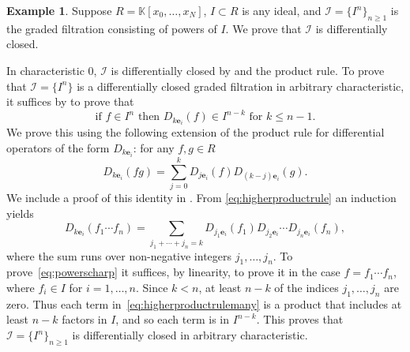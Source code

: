 \documentclass[12pt, reqno]{amsart}
\numberwithin{equation}{section}
\newcommand{\be}{\mathbf{e}}
\newcommand{\kk}{\mathbb{K}}
\newcommand{\I}{{\mathcal I}}
\theoremstyle{plain} %
\theoremstyle{definition}
\newtheorem{ex}[thm]{Example}
\theoremstyle{remark}
\begin{document}
\begin{ex}\label{ex:PowersDiffClosed}
Suppose $R=\kk[x_0,\ldots,x_N]$, $I\subset R$ is any ideal, and $\I=\{I^{n}\}_{n\ge 1}$ is the graded filtration consisting of powers of $I$.  We prove that $\I$ is differentially closed.

In characteristic $0$, $\I$ is differentially closed by  and the product rule.
To prove that $\I=\{I^n\}$ is a differentially closed graded filtration in arbitrary characteristic, it suffices by  to prove that
\begin{equation}\label{eq:powerscharp}
\mbox{if }f\in I^n \mbox{ then } D_{k\be_i}(f)\in I^{n-k} \mbox{ for } k\le n-1.
\end{equation}
We prove this using the following extension of the product rule for differential  operators of the form $D_{k\be_i}$:  for any $f,g\in R$
\begin{equation}\label{eq:higherproductrule}
D_{k\be_i}(fg)=\sum_{j=0}^k D_{j\be_i}(f)D_{(k-j)\be_i}(g).
\end{equation}
We include a proof of this identity in .  From \eqref{eq:higherproductrule} an induction yields
\begin{equation}\label{eq:higherproductrulemany}
D_{k\be_i}(f_1\cdots f_n)=\sum_{j_1+\cdots+j_n=k} D_{j_1\be_i}(f_1)D_{j_2\be_i}\cdots D_{j_n\be_i}(f_n),
\end{equation}
where the sum runs over non-negative integers $j_1,\ldots,j_n$.  To prove~\eqref{eq:powerscharp} it suffices, by linearity, to prove it in the case $f=f_1\cdots f_n$, where $f_i\in I$ for $i=1,\ldots,n$.  Since $k<n$, at least $n-k$ of the indices $j_1,\ldots,j_n$ are zero.  Thus  each term in~\eqref{eq:higherproductrulemany} is a product that includes at least $n-k$ factors in $I$, and so each term is in $I^{n-k}$.  This proves that $\I=\{I^n\}_{n\ge 1}$ is differentially closed in arbitrary characteristic.


\end{ex}
\end{document}
